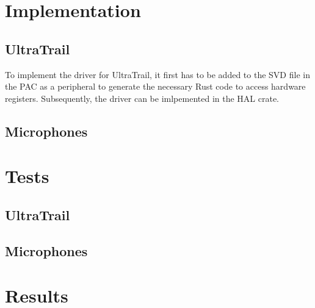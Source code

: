 
\section{Implementation}

\subsection{UltraTrail}

To implement the driver for UltraTrail, it first has to be added to the SVD file in the PAC
as a peripheral to generate the necessary Rust code to access hardware registers.
Subsequently, the driver can be imlpemented in the HAL crate.

\subsection{Microphones}


\section{Tests}

\subsection{UltraTrail}


\subsection{Microphones}


\section{Results}


